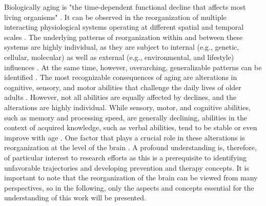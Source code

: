 Biologically aging is "the time-dependent functional decline that affects most living organisms" \cite{López-Otín2013}. It can be observed in the reorganization of multiple interacting physiological systems operating at different spatial and temporal scales \cite{Mooney2016}. The underlying patterns of reorganization within and between these systems are highly individual, as they are subject to internal (e.g., genetic, cellular, molecular) as well as external (e.g., environmental, and lifestyle) influences \cite{Smith2020, Mooney2016, Cohen2022}. At the same time, however, overarching, generalizable patterns can be identified \cite{Salthouse2019}. The most recognizable consequences of aging are alterations in cognitive, sensory, and motor abilities that challenge the daily lives of older adults \cite{Li2002}. However, not all abilities are equally affected by declines, and the alterations are highly individual. While sensory, motor, and cognitive abilities, such as memory and processing speed, are generally declining, abilities in the context of acquired knowledge, such as verbal abilities, tend to be stable or even improve with age \cite{Park2009}. One factor that plays a crucial role in these alterations is reorganization at the level of the brain \cite{Reuter-Lorenz2010}. A profound understanding is, therefore, of particular interest to research efforts as this is a prerequisite to identifying unfavorable trajectories and developing prevention and therapy concepts. It is important to note that the reorganization of the brain can be viewed from many perspectives, so in the following, only the aspects and concepts essential for the understanding of this work will be presented. 

